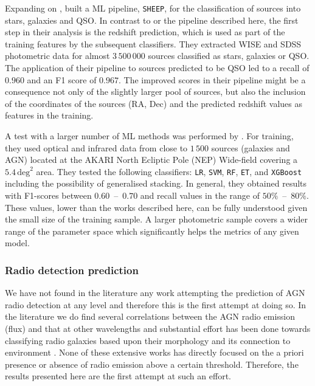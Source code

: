 \documentclass{aa}
\begin{document}
Expanding on \citet{2020A&A...639A..84C}, \citet{2022A&A...666A..87C} built a ML pipeline, \texttt{SHEEP}, for the classification of sources into stars, galaxies and QSO. In contrast to \citet{2020A&A...639A..84C} or the pipeline described here, the first step in their analysis is the redshift prediction, which is used as part of the training features by the subsequent classifiers. They extracted WISE and SDSS \citep[DR15;][]{2019ApJS..240...23A} photometric data for almost $3\,500\,000$ sources classified as stars, galaxies or QSO. The application of their pipeline to sources predicted to be QSO led to a recall of $0.960$ and an F1 score of $0.967$. The improved scores in their pipeline might be a consequence not only of the slightly larger pool of sources, but also the inclusion of the coordinates of the sources (RA, Dec) and the predicted redshift values as features in the training. %

A test with a larger number of ML methods was performed by \citet{2021A&A...651A.108P}. For training, they used optical and infrared data from close to $1\,500$ sources (galaxies and AGN) located at the AKARI North Ecliptic Pole (NEP) Wide-field \citep{2009PASJ...61..375L, 2012A&A...548A..29K} covering a $5.4\, \mathrm{deg}^{2}$ area. They tested  the following classifiers: \verb|LR|, \verb|SVM|, \verb|RF|, \verb|ET|, and \verb|XGBoost| including the possibility of generalised stacking. In general, they obtained results with F1-scores between $0.60$~--~$0.70$ and recall values in the range of $50\%$~--~$80\%$. 
These values, lower than the works described here, can be fully understood given the small size of the training sample. A larger photometric sample covers a wider range of the parameter space which significantly helps the metrics of any given model.

\subsubsection{Radio detection prediction}\label{sec:previous_radio_detection}

We have not found in the literature any work attempting the prediction of AGN radio detection at any level and therefore this is the first attempt at doing so. In the literature we do find several correlations between the AGN radio emission (flux) and that at other wavelengths \citep[e.g. with infrared emission,][]{1985ApJ...298L...7H, 1992ARA&A..30..575C} and substantial effort has been done towards classifying radio galaxies based upon their morphology \citep[e.g.][FRI, FRII, bent jets, etc.]{2017ApJS..230...20A, 2019MNRAS.482.1211W} and its connection to environment \citep{2008A&ARv..15...67M, 2022A&ARv..30....6M}. None of these extensive works has directly focused on the a priori presence or absence of radio emission above a certain threshold. Therefore, the results presented here are the first attempt at such an effort.
\end{document}
